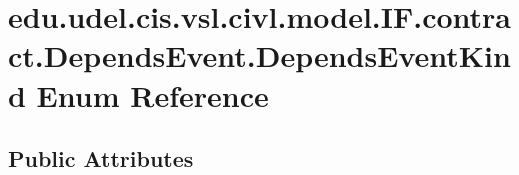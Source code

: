 \hypertarget{enumedu_1_1udel_1_1cis_1_1vsl_1_1civl_1_1model_1_1IF_1_1contract_1_1DependsEvent_1_1DependsEventKind}{}\section{edu.\+udel.\+cis.\+vsl.\+civl.\+model.\+I\+F.\+contract.\+Depends\+Event.\+Depends\+Event\+Kind Enum Reference}
\label{enumedu_1_1udel_1_1cis_1_1vsl_1_1civl_1_1model_1_1IF_1_1contract_1_1DependsEvent_1_1DependsEventKind}
\subsection*{Public Attributes}
